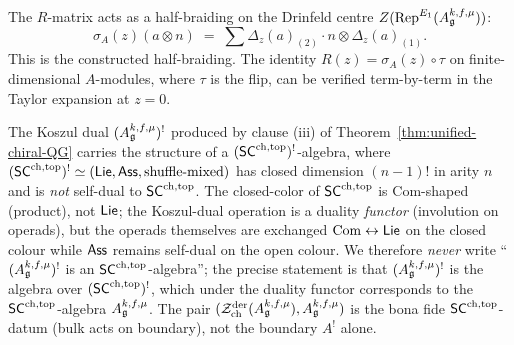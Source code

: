 \begin{remark}
\label{rem:half-braiding}
The $R$-matrix acts as a half-braiding on the Drinfeld centre
$Z(\mathrm{Rep}^{E_1}(A_{\mathfrak{g}}^{k,f,\mu}))$:
\[
 \sigma_A(z)(a\otimes n)
 \;=\; \sum \Delta_z(a)_{(2)}\cdot n \otimes \Delta_z(a)_{(1)}.
\]
This is the constructed half-braiding. The
identity $R(z) = \sigma_A(z)\circ \tau$ on finite-dimensional
$A$-modules, where $\tau$ is the flip, can be verified term-by-term in
the Taylor expansion at $z=0$.
\end{remark}

\begin{remark}
\label{rem:A-koszul-SC-not-SC}
The Koszul dual $(A_{\mathfrak{g}}^{k,f,\mu})^{!}$ produced by clause (iii) of
Theorem~\ref{thm:unified-chiral-QG} carries the structure of a
$(\mathsf{SC}^{\mathrm{ch},\mathrm{top}})^{!}$-algebra, where $(\mathsf{SC}^{\mathrm{ch},\mathrm{top}})^{!} \simeq (\mathsf{Lie}, \mathsf{Ass},
\text{shuffle-mixed})$ has closed dimension $(n-1)!$ in arity $n$ and
is \emph{not} self-dual to $\mathsf{SC}^{\mathrm{ch},\mathrm{top}}$. The closed-color of $\mathsf{SC}^{\mathrm{ch},\mathrm{top}}$ is
$\mathrm{Com}$-shaped (product), not $\mathsf{Lie}$; the Koszul-dual
operation is a duality \emph{functor} (involution on operads), but the
operads themselves are exchanged $\mathrm{Com}\leftrightarrow\mathsf{Lie}$ on
the closed colour while $\mathsf{Ass}$ remains self-dual on the open colour.
We therefore \emph{never} write
``$(A_{\mathfrak{g}}^{k,f,\mu})^{!}$ is an $\mathsf{SC}^{\mathrm{ch},\mathrm{top}}$-algebra''; the precise
statement is that $(A_{\mathfrak{g}}^{k,f,\mu})^{!}$ is the algebra over
$(\mathsf{SC}^{\mathrm{ch},\mathrm{top}})^{!}$, which under the duality functor corresponds to the
$\mathsf{SC}^{\mathrm{ch},\mathrm{top}}$-algebra $A_{\mathfrak{g}}^{k,f,\mu}$. The pair
$(\mathcal{Z}^{\mathrm{der}}_{\mathrm{ch}}(A_{\mathfrak{g}}^{k,f,\mu}),
A_{\mathfrak{g}}^{k,f,\mu})$ is the bona fide $\mathsf{SC}^{\mathrm{ch},\mathrm{top}}$-datum (bulk acts on
boundary), not the boundary $A^{!}$ alone.
\end{remark}

